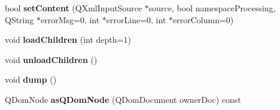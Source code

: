 \begin{DoxyCompactItemize}
\item 
\hypertarget{classKoXmlNodeData_ad9ed87de0785892c4a99394c4331d40e}{
bool {\bfseries setContent} (QXmlInputSource $\ast$source, bool namespaceProcessing, QString $\ast$errorMsg=0, int $\ast$errorLine=0, int $\ast$errorColumn=0)}
\label{classKoXmlNodeData_ad9ed87de0785892c4a99394c4331d40e}

\item 
\hypertarget{classKoXmlNodeData_aa48c11006049cd38949e4acb1b29e880}{
void {\bfseries loadChildren} (int depth=1)}
\label{classKoXmlNodeData_aa48c11006049cd38949e4acb1b29e880}

\item 
\hypertarget{classKoXmlNodeData_a43fbd99f9450150f8690679b387617f8}{
void {\bfseries unloadChildren} ()}
\label{classKoXmlNodeData_a43fbd99f9450150f8690679b387617f8}

\item 
\hypertarget{classKoXmlNodeData_a15cf8216d2bbe022da0b915ccf1fe86c}{
void {\bfseries dump} ()}
\label{classKoXmlNodeData_a15cf8216d2bbe022da0b915ccf1fe86c}

\item 
\hypertarget{classKoXmlNodeData_a440898286bc225479ac2f68d299e9181}{
QDomNode {\bfseries asQDomNode} (QDomDocument ownerDoc) const }
\label{classKoXmlNodeData_a440898286bc225479ac2f68d299e9181}

\end{DoxyCompactItemize}
